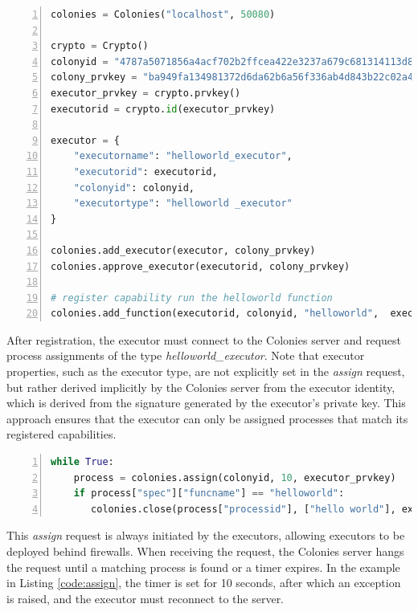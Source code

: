 \documentclass{article}
\begin{document}
\begin{lstlisting}[showstringspaces=false, frame=lines, numbers=left, numberstyle=\scriptsize, backgroundcolor=\color{background}, basicstyle=\small, label=code:regexecutor, language=Python, caption=Register an executor to a colony in Python.]
colonies = Colonies("localhost", 50080)

crypto = Crypto()
colonyid = "4787a5071856a4acf702b2ffcea422e3237a679c681314113d86139461290cf4"
colony_prvkey = "ba949fa134981372d6da62b6a56f336ab4d843b22c02a4257dcf7d0d73097514"
executor_prvkey = crypto.prvkey()
executorid = crypto.id(executor_prvkey)

executor = {
    "executorname": "helloworld_executor",
    "executorid": executorid,
    "colonyid": colonyid,
    "executortype": "helloworld _executor"
}

colonies.add_executor(executor, colony_prvkey)
colonies.approve_executor(executorid, colony_prvkey)

# register capability run the helloworld function
colonies.add_function(executorid, colonyid, "helloworld",  executor_prvkey)
\end{lstlisting}

After registration, the executor must connect to the Colonies server and request process assignments of the type \emph{helloworld\_executor}. Note that executor properties, such as the executor type, are not explicitly set in the \emph{assign} request, but rather derived implicitly by the Colonies server from the executor identity, which is derived from the signature generated by the executor's private key. This approach ensures that the executor can only be assigned processes that match its registered capabilities.

\begin{lstlisting}[showstringspaces=false, frame=lines, numbers=left, numberstyle=\scriptsize, backgroundcolor=\color{background}, basicstyle=\small, language=Python, label=code:assign, caption=Assigning and executing a process in Python.]
while True:
    process = colonies.assign(colonyid, 10, executor_prvkey)
    if process["spec"]["funcname"] == "helloworld":
       colonies.close(process["processid"], ["hello world"], executor_prvkey)
\end{lstlisting}

This \emph{assign} request is always initiated by the executors, allowing executors to be deployed behind firewalls. When receiving the request, the Colonies server hangs the request until a matching process is found or a timer expires. In the example in Listing \ref{code:assign}, the timer is set for 10 seconds, after which an exception is raised, and the executor must reconnect to the server.
\end{document}
